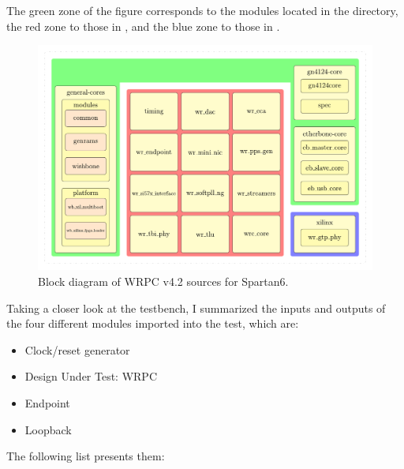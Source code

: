 \noindent The green zone of the figure corresponds to the modules located in the  directory, the red zone to those in , and the blue zone to those in .

\begin{landscape}

\begin{figure}[H]
    \centering
    \includegraphics[width=26cm]{figures/wrpc-sources-diagram.pdf}
    \caption{Block diagram of WRPC v4.2 sources for Spartan6.}
    \label{fig:dig}
\end{figure}
\restoregeometry
\end{landscape}

\noindent Taking a closer look at the  testbench, I summarized the inputs and outputs of the four different modules imported into the test, which are:

\begin{itemize}
\item Clock/reset generator
\item Design Under Test: WRPC
\item Endpoint
\item Loopback
\end{itemize}

\noindent The following list presents them:

